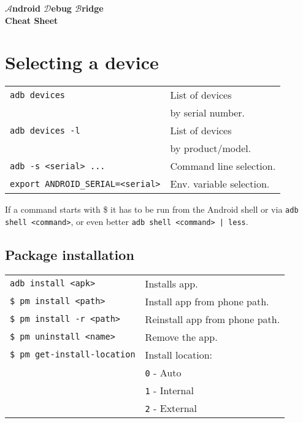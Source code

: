 \documentclass[11pt,landscape,a4paper]{article}
\begin{document}
\raggedright
\footnotesize
\begin{multicols}{3}


\setlength{\premulticols}{1pt}
\setlength{\postmulticols}{2pt}
\setlength{\multicolsep}{13pt}
\setlength{\columnsep}{13pt}

\begin{center}
     \Large{\textbf{$\mathcal{A}$ndroid $\mathcal{D}$ebug $\mathcal{B}$ridge\\ Cheat Sheet}} \\
\end{center}

\section{Selecting a device}
\begin{tabular}{@{}ll@{}}
\verb!adb devices!    & List of devices \\
& \hspace*{3mm} by serial number. \\
\verb!adb devices -l!    & List of devices\\
&  \hspace*{3mm} by product/model. \\
\verb!adb -s <serial> ...!  & Command line selection. \\
\verb!export ANDROID_SERIAL=<serial>! & Env. variable selection. \\
\end{tabular}

\vspace*{2mm}

If a command starts with \$ it has to be run from the Android shell or via \verb!adb shell <command>!, or even better \verb!adb shell <command> | less!.

\subsection{Package installation}
\newlength{\MyLen}
\begin{tabular}{@{}ll@{}}
\texttt{adb install <apk>} & Installs app. \\
\texttt{\$ pm install <path>}  &  Install app from phone path. \\
\texttt{\$ pm install -r <path>}  &  Reinstall app from phone path. \\
\texttt{\$ pm uninstall <name>}   & Remove the app. \\
\texttt{\$ pm get-install-location}  &  Install location:\\
& \texttt{0} - Auto \\
& \texttt{1} - Internal \\
& \texttt{2} - External \\
\end{tabular}



\end{multicols}
\end{document}
